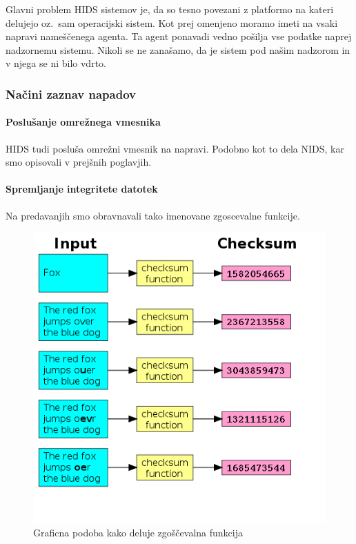\documentclass[12pt]{article}
\begin{document}
Glavni problem HIDS sistemov je, da so tesno povezani z platformo na kateri delujejo 
oz.\ sam operacijski sistem.
Kot prej omenjeno moramo imeti na vsaki napravi nameščenega agenta. Ta agent ponavadi vedno pošilja vse podatke naprej nadzornemu sistemu.
Nikoli se ne zanašamo, da je sistem pod našim nadzorom in v njega se ni bilo vdrto.


\subsubsection{Načini zaznav napadov} %

\paragraph{Poslušanje omrežnega vmesnika} %

HIDS tudi posluša omrežni vmesnik na napravi. 
Podobno kot to dela NIDS, kar smo opisovali v prejšnih poglavjih.


\paragraph{Spremljanje integritete datotek} %

Na predavanjih smo obravnavali tako imenovane zgoscevalne funkcije.

\begin{figure}[htb]
\begin{center}
\includegraphics[scale=0.5]{checksum.png}
\end{center}
\caption{Graficna podoba kako deluje zgoščevalna funkcija}
\label{checksum_img}
\end{figure}
\end{document}
